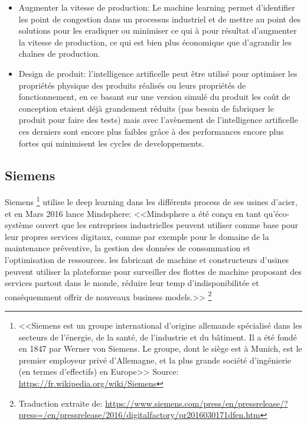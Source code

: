 \begin{itemize}
            \item Augmenter la vitesse de production: Le machine learning permet d'identifier les point 
            de congestion dans un processus industriel et de mettre au point des solutions pour les eradiquer 
            ou minimiser ce qui à pour résultat d'augmenter la vitesse de production, ce qui est bien 
            plus économique que d'agrandir les chaînes de production. \newline 

            \item Design de produit: l'intelligence artificelle peut être utilisé pour optimiser les propriétés 
            physique des produits réalisés ou leurs propriétés de fonctionnement, en ce basant sur une
            version simulé du produit les coût de conception etaient déjà grandement réduits 
            (pas besoin de fabriquer le produit pour faire des tests) mais avec l'avènement de 
            l'intelligence artificelle ces derniers sont encore plus faibles grâce à des performances
            encore plus fortes qui minimisent les cycles de developpements.
            \newline
        \end{itemize}

        \subsection*{Siemens}
            Siemens \footnote{<<Siemens est un groupe 
            international d’origine allemande spécialisé dans les secteurs de l'énergie, 
            de la santé, de l'industrie et du bâtiment. 
            Il a été fondé en 1847 par Werner von Siemens. 
            Le groupe, dont le siège est à Munich, est le premier employeur privé d'Allemagne, 
            et la plus grande société d'ingénierie (en termes d'effectifs) en Europe>> 
            Source: \url{https://fr.wikipedia.org/wiki/Siemens}}
            utilise le deep learning dans les différents process de ses usines d'acier,
            et en Mars 2016 lance Mindsphere: 
            <<Mindsphere a été conçu en tant qu'éco-système ouvert que les entreprises industrielles
            peuvent utiliser comme base pour leur propres services digitaux, comme par exemple pour 
            le domaine de la maintenance préventive, la gestion des données de consommation et 
            l'optimisation de ressources. les fabricant de machine et constructeurs d'usines
            peuvent utiliser la plateforme pour surveiller des flottes de machine proposant des
            services partout dans le monde, réduire leur temp d'indisponibilitée et 
            conséquemment offrir de nouveaux business models.>> 
            \footnote{Traduction extraite de: \url{https://www.siemens.com/press/en/pressrelease/?press=/en/pressrelease/2016/digitalfactory/pr2016030171dfen.htm}}
            \newline

